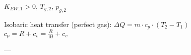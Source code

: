 \( K_{EW,1} > 0 \), \( T_{g,2} \), \( p_{g,2} \)  

Isobaric heat transfer (perfect gas):  
\( \Delta Q = m \cdot c_p \cdot (T_2 - T_1) \)  
\( c_p = R + c_v = \frac{R}{M} + c_v \)  

---